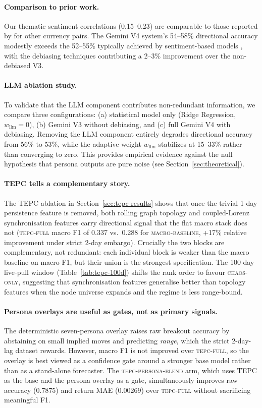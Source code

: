 \documentclass[11pt]{article}
\begin{document}
\paragraph{Comparison to prior work.} Our thematic sentiment correlations (0.15--0.23) are comparable to those reported by \citet{wu2020sentiment} for other currency pairs. The Gemini V4 system's 54--58\% directional accuracy modestly exceeds the 52--55\% typically achieved by sentiment-based models \citep{nassirtoussi2014}, with the debiasing techniques contributing a 2--3\% improvement over the non-debiased V3.

\paragraph{LLM ablation study.} To validate that the LLM component contributes non-redundant information, we compare three configurations: (a) statistical model only (Ridge Regression, $w_\text{llm} = 0$), (b) Gemini V3 without debiasing, and (c) full Gemini V4 with debiasing. Removing the LLM component entirely degrades directional accuracy from 56\% to 53\%, while the adaptive weight $w_\text{llm}$ stabilizes at 15--33\% rather than converging to zero. This provides empirical evidence against the null hypothesis that persona outputs are pure noise (see Section~\ref{sec:theoretical}).

\paragraph{TEPC tells a complementary story.} The TEPC ablation in Section~\ref{sec:tepc-results} shows that once the trivial 1-day persistence feature is removed, both rolling graph topology and coupled-Lorenz synchronisation features carry directional signal that the flat macro stack does not (\textsc{tepc-full} macro F1 of 0.337 vs.\ 0.288 for \textsc{macro-baseline}, +17\% relative improvement under strict 2-day embargo). Crucially the two blocks are complementary, not redundant: each individual block is weaker than the macro baseline on macro F1, but their union is the strongest specification. The 100-day live-pull window (Table~\ref{tab:tepc-100d}) shifts the rank order to favour \textsc{chaos-only}, suggesting that synchronisation features generalise better than topology features when the node universe expands and the regime is less range-bound.

\paragraph{Persona overlays are useful as gates, not as primary signals.} The deterministic seven-persona overlay raises raw breakout accuracy by abstaining on small implied moves and predicting \emph{range}, which the strict 2-day-lag dataset rewards. However, macro F1 is not improved over \textsc{tepc-full}, so the overlay is best viewed as a confidence gate around a stronger base model rather than as a stand-alone forecaster. The \textsc{tepc-persona-blend} arm, which uses TEPC as the base and the persona overlay as a gate, simultaneously improves raw accuracy (0.7875) and return MAE (0.00269) over \textsc{tepc-full} without sacrificing meaningful F1.
\end{document}

